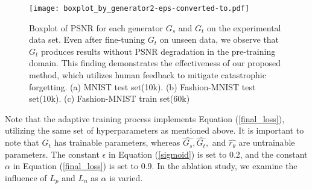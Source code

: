 \documentclass[lettersize,journal]{IEEEtran}
\begin{document}
\begin{figure}[!t]
\centering
\texttt{[image: boxplot\_by\_generator2-eps-converted-to.pdf]}
\caption{Boxplot of PSNR for each generator $G_s$ and $G_t$ on the experimental data set. Even after fine-tuning $G_t$ on unseen data, we observe that $G_t$ produces results without PSNR degradation in the pre-training domain. This finding demonstrates the effectiveness of our proposed method, which utilizes human feedback to mitigate catastrophic forgetting. (a) MNIST test set(10k). (b) Fashion-MNIST test set(10k). (c) Fashion-MNIST train set(60k)}
\label{boxplot_by_generator}
\end{figure}

 Note that the adaptive training process implements Equation (\ref{final_loss}), utilizing the same set of hyperparameters as mentioned above. It is important to note that $G_t$ has trainable parameters, whereas $\hat{G_s}, \hat{G_t},$ and $\hat{r_\theta}$ are untrainable parameters. The constant $\epsilon$ in Equation (\ref{sigmoid}) is set to 0.2, and the constant $\alpha$ in Equation (\ref{final_loss}) is set to 0.9. In the ablation study, we examine the influence of $L_p$ and $L_{n}$ as $\alpha$ is varied.
\end{document}

